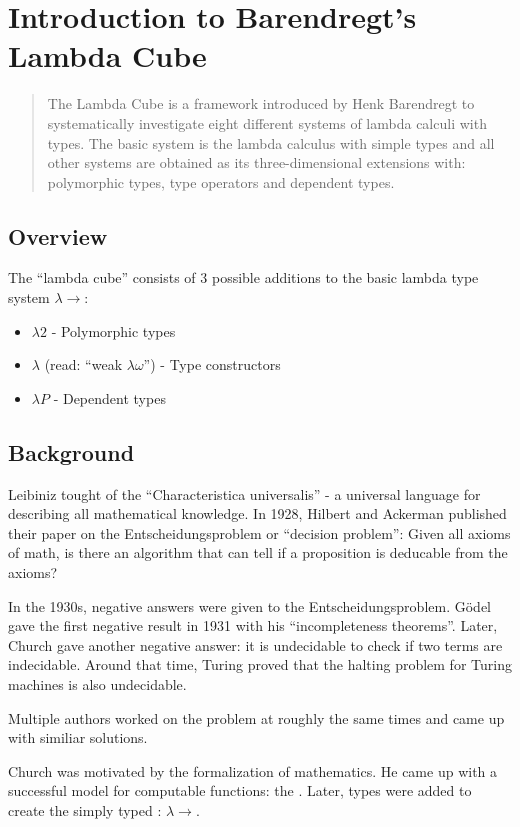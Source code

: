 \section{Introduction to Barendregt's Lambda Cube}
\begin{abstract}
	The Lambda Cube is a framework introduced by Henk Barendregt to systematically investigate eight different systems of lambda calculi with types. The basic system is the lambda calculus with simple types and all other systems are obtained as its three-dimensional extensions with: polymorphic types, type operators and dependent types.
\end{abstract}

\subsection{Overview}
The ``lambda cube'' consists of 3 possible additions to the basic lambda type system $\lambda\to$:
\begin{itemize}
	\item $\lambda2$ - Polymorphic types
	\item $\lambda$\underbar{$\omega$} (read: ``weak $\lambda\omega$'') - Type constructors
	\item $\lambda P$ - Dependent types
\end{itemize}

\subsection{Background}
Leibiniz tought of the ``Characteristica universalis'' - a universal language for describing all mathematical knowledge.
In 1928, Hilbert and Ackerman published their paper on the Entscheidungsproblem or ``decision problem'': Given all axioms
of math, is there an algorithm that can tell if a proposition is deducable from the axioms?

In the 1930s, negative answers were given to the Entscheidungsproblem. G\"odel gave the first negative result in 1931
with his ``incompleteness theorems''. Later, Church gave another negative answer: it is undecidable to check if
two \lc terms are indecidable. Around that time, Turing proved that the halting problem for Turing
machines is also undecidable.

Multiple authors worked on the problem at roughly the same times and came up with similiar solutions.

Church was motivated by the formalization of mathematics. He came up with a successful model for computable
functions: the \lc. Later, types were added to create the simply typed \lc: $\lambda\to$.

